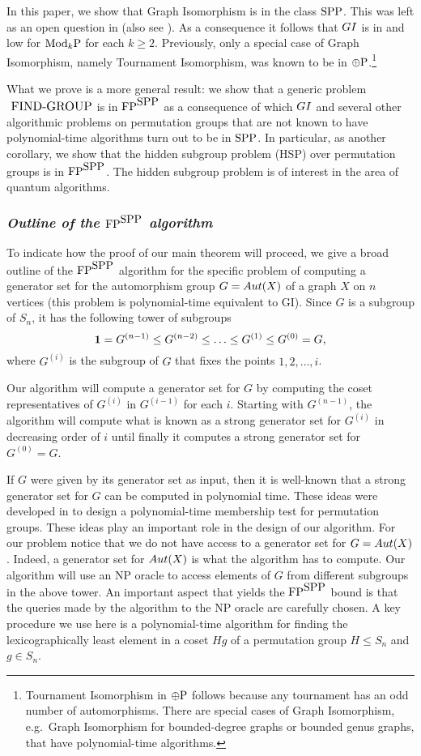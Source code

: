 \documentclass{elsart}
\newcommand{\FP}{\mbox{\rm FP}}
\newcommand{\ParityP}{\mbox{$\oplus$\rm P}}
\newcommand{\ModkP}{\mbox{\rm Mod$_k$P}}
\newcommand{\SPP}{\mbox{\rm SPP}}
\newcommand{\FINDGROUP}{\mbox{\small\rm FIND{-}GROUP}}
\newcommand{\HSP}{\mbox{\small\rm HSP}}
\newcommand{\GI}{{\rm{GI}}}
\newcommand {\Aut}[1]{{\rm Aut}({#1})}
\begin{document}
In this paper, we show that Graph Isomorphism is in the class $\SPP$.
This was left as an open question in \cite{kobler92graph} (also see
\cite{fenner91gapdefinable}).  As a consequence it follows that $\GI$
is in and low for $\ModkP$ for each $k\geq 2$. Previously, only a
special case of Graph Isomorphism, namely Tournament Isomorphism, was
known to be in $\ParityP$.\footnote{Tournament Isomorphism in
$\ParityP$ follows because any tournament has an odd number of
automorphisms. There are special cases of Graph Isomorphism, e.g.\
Graph Isomorphism for bounded-degree graphs or bounded genus graphs,
that have polynomial-time algorithms.}

What we prove is a more general result: we show that a generic problem
$\FINDGROUP$ is in $\FP^{\SPP}$ as a consequence of which $\GI$ and
several other algorithmic problems on permutation groups that are not
known to have polynomial-time algorithms turn out to be in $\SPP$. In
particular, as another corollary, we show that the hidden subgroup
problem (\HSP) over permutation groups is in $\FP^{\SPP}$.  The hidden
subgroup problem is of interest in the area of quantum algorithms.

\subsubsection*{\it Outline of the $\FP^{\SPP}$ algorithm}

To indicate how the proof of our main theorem will proceed, we give a
broad outline of the $\FP^{\SPP}$ algorithm for the specific problem
of computing a generator set for the automorphism group $G=\Aut X$ of
a graph $X$ on $n$ vertices (this problem is polynomial-time
equivalent to GI). Since $G$ is a subgroup of $S_n$, it has the
following tower of subgroups
\[
{\bf 1}=G^{(n-1)}\leq G^{(n-2)}\leq\ldots\leq
G^{(1)}\leq G^{(0)}=G,
\]
where $G^{(i)}$ is the subgroup of $G$ that fixes the points
$1,2,\ldots,i$.

Our algorithm will compute a generator set for $G$ by computing the
coset representatives of $G^{(i)}$ in $G^{(i-1)}$ for each $i$.
Starting with $G^{(n-1)}$, the algorithm will compute what is known as
a strong generator set for $G^{(i)}$ in decreasing order of $i$ until
finally it computes a strong generator set for $G^{(0)}=G$.

If $G$ were given by its generator set as input, then it is well-known
that a strong generator set for $G$ can be computed in polynomial
time.  These ideas were developed in
\cite{sims70computational,furst80polynomialtime} to design a
polynomial-time membership test for permutation groups. These ideas
play an important role in the design of our algorithm. For our problem
notice that we do not have access to a generator set for $G=\Aut X$.
Indeed, a generator set for $\Aut X$ is what the algorithm has to
compute. Our algorithm will use an NP oracle to access elements of $G$
from different subgroups in the above tower. An important aspect that
yields the $\FP^{\SPP}$ bound is that the queries made by the
algorithm to the NP oracle are carefully chosen. A key procedure we
use here is a polynomial-time algorithm for finding the
lexicographically least element in a coset $Hg$ of a permutation group
$H\leq S_n$ and $g\in S_n$.
\end{document}
